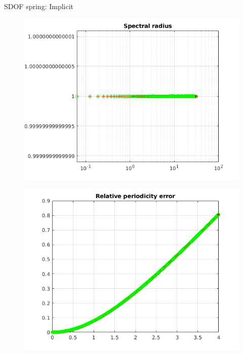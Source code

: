\begin{frame}{SDOF spring: Implicit}
\begin{figure}[ht]
\begin{minipage}[b]{0.5\linewidth}
  \end{minipage}%
  \begin{minipage}[b]{0.5\linewidth}
    \centering
    \includegraphics[scale=.35]{images/sdof-imp-2.png} \\
  \end{minipage} 
  \begin{minipage}[b]{0.5\linewidth}
    \centering
    \includegraphics[scale=.35]{images/sdof-imp-3.png} \\


\end{minipage}
\end{figure}
\end{frame}
